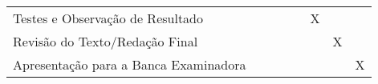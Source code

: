 \begin{table}[!htb]
\begin{tabular}{@{}llllllll@{}}
    Testes e Observação de Resultado                                                                             & {\color[HTML]{656565} }  & {\color[HTML]{656565} }  & {\color[HTML]{656565} }  & {\color[HTML]{656565} }  & {\color[HTML]{656565} X} & {\color[HTML]{656565} }  & {\color[HTML]{656565} }  \\
    Revisão do Texto/Redação Final                                                                               & {\color[HTML]{656565} }  & {\color[HTML]{656565} }  & {\color[HTML]{656565} }  & {\color[HTML]{656565} }  & {\color[HTML]{656565} }  & {\color[HTML]{656565} X} & {\color[HTML]{656565} }  \\
    Apresentação para a Banca Examinadora                                                                        & {\color[HTML]{656565} }  & {\color[HTML]{656565} }  & {\color[HTML]{656565} }  & {\color[HTML]{656565} }  & {\color[HTML]{656565} }  & {\color[HTML]{656565} }  & {\color[HTML]{656565} X} \\ \bottomrule
    \end{tabular}
\end{table}